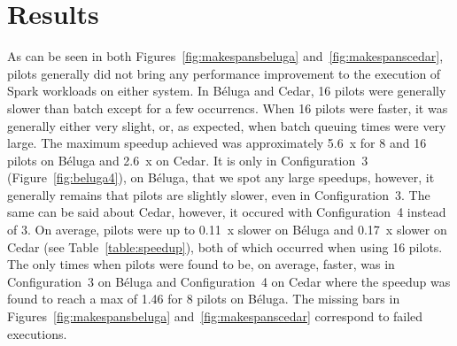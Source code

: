 \documentclass{IEEEtran}
\newcommand{\todo}[1]{\marginpar{\parbox{18mm}{\flushleft\tiny\color{red}\textbf{TODO}:
      #1}}}
\begin{document}


\section{Results}\label{sec:results}

As can be seen in both Figures~\ref{fig:makespansbeluga} and~\ref{fig:makespanscedar}, pilots 
generally did not bring any performance improvement to the execution of Spark workloads
on either system. In B\'eluga and Cedar, 16 pilots were generally slower than batch except for a 
few occurrencs. When 16 pilots were faster, it was generally either very slight, or, as expected,
when batch queuing times were very large. The maximum speedup achieved
was approximately 5.6~x for 8 and 16 pilots on B\'eluga and 2.6~x on Cedar. 
It is only in Configuration~3 (Figure~\ref{fig:beluga4}), on B\'eluga,
that we spot any large speedups, however, it generally remains that
pilots are slightly slower, even in Configuration~3. The same can be said about Cedar, however,
it occured with Configuration~4 instead of 3. On average, pilots were up to 0.11~x slower on B\'eluga and
0.17~x slower on Cedar (see Table~\ref{table:speedup}), both of which occurred when using 16 pilots.
The only times when pilots were found to be, on average, faster, was in Configuration~3 on B\'eluga
and Configuration~4 on Cedar where the speedup was found to reach a max of 1.46 for 8 pilots on 
B\'eluga. The missing bars in Figures~\ref{fig:makespansbeluga} and~\ref{fig:makespanscedar} correspond to 
failed executions.
\end{document}
